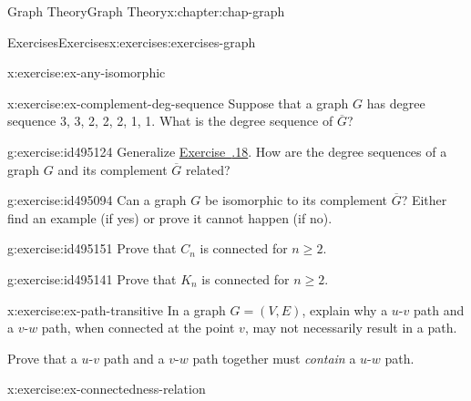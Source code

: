 \documentclass[oneside,10pt,]{book}
\newcommand{\xreffont}{\relax}
\numberwithin{equation}{section}
\begin{document}
\begin{chapterptx}{Graph Theory}{}{Graph Theory}{}{}{x:chapter:chap-graph}
\begin{exercises-section}{Exercises}{}{Exercises}{}{}{x:exercises:exercises-graph}
\begin{divisionexercise}{17}{}{}{x:exercise:ex-any-isomorphic}
\begin{sidebyside}{4}{0.015}{0.015}{0.03}
\begin{sbspanel}{0.22}
{
}%
\end{sbspanel}%
\end{sidebyside}%
\end{divisionexercise}%
\begin{divisionexercise}{18}{}{}{x:exercise:ex-complement-deg-sequence}%
Suppose that a graph \(G\) has degree sequence 3, 3, 2, 2, 2, 1, 1. What is the degree sequence of \(\overline{G}\)?%
\end{divisionexercise}%
\begin{divisionexercise}{19}{}{}{g:exercise:id495124}%
Generalize \hyperlink{x:exercise:ex-complement-deg-sequence}{Exercise~{\xreffont 5.8.18}}. How are the degree sequences of a graph \(G\) and its complement \(\overline{G}\) related?%
\end{divisionexercise}%
\begin{divisionexercise}{20}{}{}{g:exercise:id495094}%
Can a graph \(G\) be isomorphic to its complement \(\overline{G}\)? Either find an example (if yes) or prove it cannot happen (if no).%
\end{divisionexercise}%
\begin{divisionexercise}{21}{}{}{g:exercise:id495151}%
Prove that \(C_n\) is connected for \(n \geq 2\).%
\end{divisionexercise}%
\begin{divisionexercise}{22}{}{}{g:exercise:id495141}%
Prove that \(K_n\) is connected for \(n \geq 2\).%
\end{divisionexercise}%
\begin{divisionexercise}{23}{}{}{x:exercise:ex-path-transitive}%
In a graph \(G = (V,E)\), explain why a \(u\)-\(v\) path and a \(v\)-\(w\) path, when connected at the point \(v\), may not necessarily result in a path.%
\par
Prove that a \(u\)-\(v\) path and a \(v\)-\(w\) path together must \emph{contain} a \(u\)-\(w\) path.%
\end{divisionexercise}%
\begin{divisionexercise}{24}{}{}{x:exercise:ex-connectedness-relation}%

\end{divisionexercise}
\end{exercises-section}
\end{chapterptx}
\end{document}

